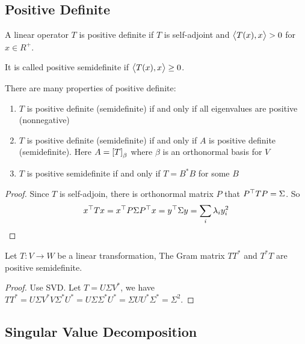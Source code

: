 \subsection{Positive Definite}

\begin{definition}
    A linear operator $T$ is positive definite if $T$ is self-adjoint and $\left\langle \displaystyle T(x), x \right\rangle > 0$ for $x \in R^+$.
    
    It is called positive semidefinite if $\left\langle \displaystyle T(x), x \right\rangle \geq 0$.
\end{definition}


There are many properties of positive definite:
\begin{enumerate}
    \item $T$ is positive definite (semidefinite) if and only if all eigenvalues are positive (nonnegative)
    \item $T$ is positive definite (semidefinite) if and only if $A$ is positive definite (semidefinite). Here $A = \coordinate{T}_\beta $ where $\beta$ is an orthonormal basis for $V$
    \item $T$ is positive semidefinite if and only if $T = B^*B$ for some $B$
\end{enumerate}
\begin{proof}
    Since $T$ is self-adjoin, there is orthonormal matrix $P$ that ${P}^\top T P = \Sigma$. So
    \begin{equation*}
        {x}^\top T x = {x}^\top P \Sigma {P}^\top x = {y}^\top \Sigma y = \sum_i \lambda_i y_i^2
    \end{equation*}
\end{proof}


\begin{theorem}\label{tt_positive_semidefinite}
    Let $T:V \rightarrow W$ be a linear transformation, The Gram matrix $TT^*$ and $T^*T$ are positive semidefinite.
\end{theorem}
\begin{proof}
    Use SVD. Let $T = U \Sigma V^*$, we have $TT^* = U \Sigma V^* V \Sigma^* U^* =  U \Sigma \Sigma^* U^* = \Sigma U U^* \Sigma^* = \Sigma^2$.
\end{proof}



\subsection{Singular Value Decomposition}

